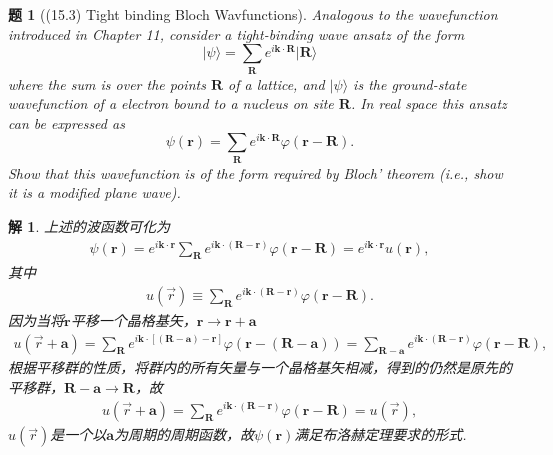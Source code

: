 \documentclass[UTF8,10pt,a4paper]{article}
\theoremstyle{Problem}
\newtheorem{prob}{题}
\theoremstyle{Solution}
\newtheorem*{sol}{解}
\begin{document}
\begin{prob}[(15.3) Tight binding Bloch Wavfunctions]
    Analogous to the wavefunction introduced in Chapter 11, consider a tight-binding wave ansatz of the form
    \[
        \lvert\psi\rangle=\sum_{\bm{R}}e^{i\bm{k}\cdot\bm{R}}\lvert\bm{R}\rangle
    \]
    where the sum is over the points $\bm{R}$ of a lattice, and $\lvert\psi\rangle$ is the ground-state wavefunction of a electron bound to a nucleus on site $\bm{R}$. In real space this ansatz can be expressed as
    \[
        \psi(\bm{r})=\sum_{\bm{R}}e^{i\bm{k}\cdot\bm{R}}\varphi(\bm{r}-\bm{R}).
    \]
    Show that this wavefunction is of the form required by Bloch' theorem (i.e., show it is a modified plane wave).
\end{prob}
\begin{sol}
    上述的波函数可化为
    \begin{align}
        \psi(\bm{r})=e^{i\bm{k}\cdot\bm{r}}\sum_{\bm{R}}e^{i\bm{k}\cdot(\bm{R}-\bm{r})}\varphi(\bm{r}-\bm{R})=e^{i\bm{k}\cdot\bm{r}}u(\bm{r}),
    \end{align}
    其中
    \begin{align}
        u(\vec{r})\equiv\sum_{\bm{R}}e^{i\bm{k}\cdot(\bm{R}-\bm{r})}\varphi(\bm{r}-\bm{R}).
    \end{align}
    因为当将$\bm{r}$平移一个晶格基矢，$\bm{r}\rightarrow\bm{r}+\bm{a}$
    \begin{align}
        u(\vec{r}+\bm{a})=\sum_{\bm{R}}e^{i\bm{k}\cdot[(\bm{R}-\bm{a})-\bm{r}]}\varphi(\bm{r}-(\bm{R}-\bm{a}))=\sum_{\bm{R}-\bm{a}}e^{i\bm{k}\cdot(\bm{R}-\bm{r})}\varphi(\bm{r}-\bm{R}),
    \end{align}
    根据平移群的性质，将群内的所有矢量与一个晶格基矢相减，得到的仍然是原先的平移群，$\bm{R}-\bm{a}\rightarrow\bm{R}$，故
    \begin{align}
        u(\vec{r}+\bm{a})=\sum_{\bm{R}}e^{i\bm{k}\cdot(\bm{R}-\bm{r})}\varphi(\bm{r}-\bm{R})=u(\vec{r}),
    \end{align}
    $u(\vec{r})$是一个以$\bm{a}$为周期的周期函数，故$\psi(\bm{r})$满足布洛赫定理要求的形式.
\end{sol}
\end{document}
